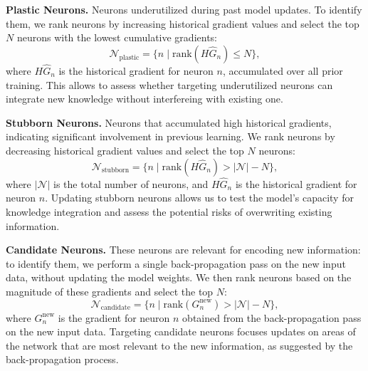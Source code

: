 \noindent \textbf{Plastic Neurons.} Neurons  underutilized during past model updates. To identify them, we rank neurons by increasing historical gradient values and select the top $N$ neurons with the lowest cumulative gradients:
        \[
        \mathcal{N}_{\text{plastic}} = \{ n \mid \text{rank}(H\hat{G}_n) \leq N \},
        \]
    where $H\hat{G}_n$ is the historical gradient for neuron $n$, accumulated over all prior training. This allows to assess whether targeting underutilized neurons can integrate new knowledge without interfereing with existing one.

\noindent \textbf{Stubborn Neurons.} Neurons that accumulated high historical gradients, indicating significant involvement in previous learning. We rank neurons by decreasing historical gradient values and select the top $N$ neurons:
        \[
        \mathcal{N}_{\text{stubborn}} = \{ n \mid \text{rank}(H\hat{G}_n) > |\mathcal{N}| - N \},
        \]
    where $|\mathcal{N}|$ is the total number of neurons, and $H\hat{G}_n$ is the historical gradient for neuron $n$. Updating stubborn neurons allows us to test the model's capacity for knowledge integration and assess the potential risks of overwriting existing information.

\noindent \textbf{Candidate Neurons.} These  neurons are relevant for encoding new information: to identify them, we perform a single back-propagation pass on the new input data, without updating the model weights. We then rank neurons based on the magnitude of these gradients and select the top $N$:
        \[
        \mathcal{N}_{\text{candidate}} = \{ n \mid \text{rank}(G_n^{\text{new}}) > |\mathcal{N}| - N \},
        \]
    where $G_n^{\text{new}}$ is the gradient for neuron $n$ obtained from the back-propagation pass on the new input data. Targeting candidate neurons focuses updates on areas of the network that are most relevant to the new information, as suggested by the back-propagation process.

